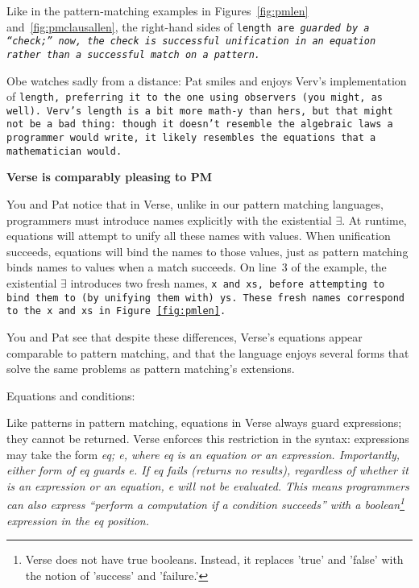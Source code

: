 \documentclass[manuscript,screen,review, 12pt]{acmart}
\begin{document}
\begin{outline}[enumerate]
    Like in the pattern-matching examples in Figures~\ref{fig:pmlen}
    and~\ref{fig:pmclausallen}, the right-hand sides of \tt{length} are
    \it{guarded} by a “check;” now, the check is successful unification in an
    equation rather than a successful match on a pattern. 

    Obe watches sadly from a distance: Pat smiles and enjoys Verv's
    implementation of \tt{length}, preferring it to the one using observers (you
    might, as well). Verv's \tt{length} is a bit more math-y than hers, but that
    might not be a bad thing: though it doesn't resemble the algebraic laws a
    programmer would write, it likely resembles the equations that a
    mathematician would. 

    
    \1 \bf{Verse is comparably pleasing to PM} 
    
    You and Pat notice that in Verse, unlike in our pattern matching languages,
    programmers must introduce names explicitly with the existential $\exists$.
    At runtime, equations will attempt to unify all these names with values.
    When unification succeeds, equations will bind the names to those values,
    just as pattern matching binds names to values when a match succeeds. On
    line~3 of the example, the existential $\exists$ introduces two fresh names,
    \tt{x} and \tt{xs}, before attempting to bind them to (by unifying them
    with) \tt{ys}. These fresh names correspond to the \tt{x} and \tt{xs} in
    Figure \ref{fig:pmlen}. 

    You and Pat see that despite these differences, Verse's equations appear
    comparable to pattern matching, and that the language enjoys several forms
    that solve the same problems as pattern matching's extensions. 

    \2 Equations and conditions: 

    Like patterns in pattern matching, equations in Verse always guard
    expressions; they cannot be returned. Verse enforces this restriction in the
    syntax: expressions may take the form \it{eq; e}, where \it{eq} is an
    equation or an expression. Importantly, either form of \it{eq} guards {e}.
    If \it{eq} fails (returns no results), regardless of whether it is an
    expression or an equation, \it{e} will not be evaluated. This means
    programmers can also express “perform a computation if a condition succeeds”
    with a boolean\footnote{Verse does not have true booleans. Instead, it
    replaces 'true' and 'false' with the notion of 'success' and 'failure.'}
    expression in the \it{eq} position. 


\end{outline}
\end{document}
